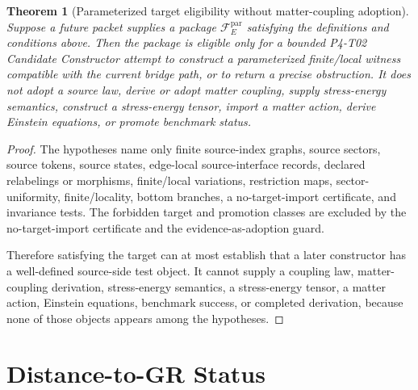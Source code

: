 \documentclass[11pt]{article}
\newtheorem{theorem}{Theorem}
\begin{document}
\begin{theorem}[Parameterized target eligibility without matter-coupling adoption]
Suppose a future packet supplies a package
\(\mathcal{F}^{\mathrm{par}}_E\) satisfying the definitions and conditions
above. Then the package is eligible only for a bounded P4-T02 Candidate
Constructor attempt to construct a parameterized finite/local witness
compatible with the current bridge path, or to return a precise obstruction.
It does not adopt a source law, derive or adopt matter coupling, supply
stress-energy semantics, construct a stress-energy tensor, import a matter
action, derive Einstein equations, or promote benchmark status.
\end{theorem}

\begin{proof}
The hypotheses name only finite source-index graphs, source sectors, source
tokens, source states, edge-local source-interface records, declared
relabelings or morphisms, finite/local variations, restriction maps,
sector-uniformity, finite/locality, bottom branches, a no-target-import
certificate, and invariance tests. The forbidden target and promotion classes
are excluded by the no-target-import certificate and the evidence-as-adoption
guard.

Therefore satisfying the target can at most establish that a later constructor
has a well-defined source-side test object. It cannot supply a coupling law,
matter-coupling derivation, stress-energy semantics, a stress-energy tensor,
a matter action, Einstein equations, benchmark success, or completed
derivation, because none of those objects appears among the hypotheses.
\end{proof}

\section{Distance-to-GR Status}
\end{document}
